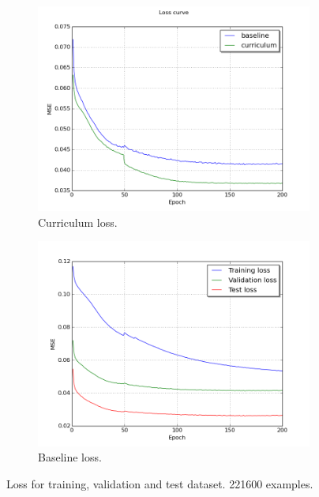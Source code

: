 \begin{figure}
\begin{subfigure}{0.48\textwidth}
\includegraphics[width=\linewidth]{figs/curr100/validation_loss_curve.png}
\caption{Curriculum loss.} \label{fig:curr100_loss}
\end{subfigure}
\hspace*{\fill} %
\begin{subfigure}{0.48\textwidth}
\includegraphics[width=\linewidth]{figs/curr100/baseline_loss_curves.png}
\caption{Baseline loss.} \label{fig:curr100_epochs_baseline}
\end{subfigure}
\hspace*{\fill} %
\caption{Loss for training, validation and test dataset. 221600 examples.} \label{fig:curr100_loss_epochs}
\end{figure}
